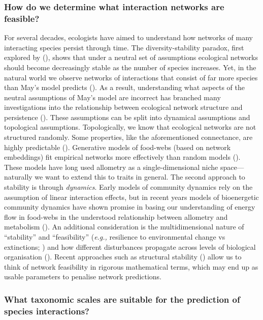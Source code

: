 \begin{refsection}
\subsubsection{How do we determine what interaction networks are
feasible?}\label{how-do-we-determine-what-interaction-networks-are-feasible}

For several decades, ecologists have aimed to understand how networks of
many interacting species persist through time. The diversity-stability
paradox, first explored by (\cite{May1974StaCom}), shows that under a neutral
set of assumptions ecological networks should become decreasingly stable
as the number of species increases. Yet, in the natural world we observe
networks of interactions that consist of far more species than May's
model predicts (\cite{Albouy2019Marine}). As a result, understanding what
aspects of the neutral assumptions of May's model are incorrect has
branched many investigations into the relationship between ecological
network structure and persistence (\cite{Allesina2012StaCri}). These
assumptions can be split into dynamical assumptions and topological
assumptions. Topologically, we know that ecological networks are not
structured randomly. Some properties, like the aforementioned
connectance, are highly predictable (\cite{MacDonald2020Revisiting}).
Generative models of food-webs (based on network embeddings) fit
empirical networks more effectively than random models
(\cite{Allesina2008GenMod}). These models have long used allometry as a
single-dimensional niche space---naturally we want to extend this to
traits in general. The second approach to stability is through
\emph{dynamics}. Early models of community dynamics rely on the
assumption of linear interaction effects, but in recent years models of
bioenergetic community dynamics have shown promise in basing our
understanding of energy flow in food-webs in the understood relationship
between allometry and metabolism (\cite{Delmas2017SimBio}). An additional
consideration is the multidimensional nature of ``stability'' and
``feasibility'' (\emph{e.g.,} resilience to environmental change vs extinctions; \cite{Dominguez-Garcia2019UnvDim}) and how different disturbances
propagate across levels of biological organisation (\cite{Kefi2019AdvOur,
Gravel2016StaCom}). Recent approaches such as structural stability
(\cite{Saavedra2017StrApp, Ferrera2016EffCom}) allow us to think of
network feasibility in rigorous mathematical terms, which may end up as
usable parameters to penalise network predictions.

\subsubsection{What taxonomic scales are suitable for the prediction of
species
interactions?}\label{what-taxonomic-scales-are-suitable-for-the-prediction-of-species-interactions}


\end{refsection}
